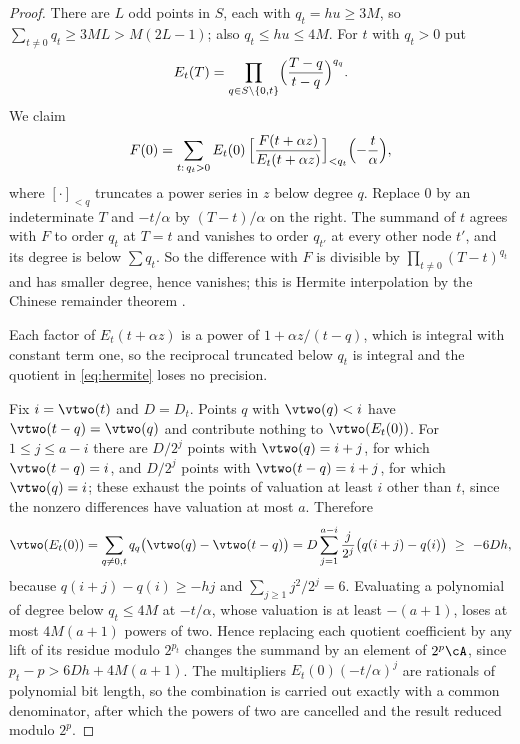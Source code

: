 \begin{proof}
There are $L$ odd points in $S$, each with $q_t=hu\ge3M$, so
$\sum_{t\ne0}q_t\ge3ML>M(2L-1)$; also $q_t\le hu\le4M$. For $t$ with $q_t>0$ put
\[
E_t(T)=\prod_{q\in S\setminus\{0,t\}}\Bigl(\frac{T-q}{t-q}\Bigr)^{q_q}.
\]
We claim
\begin{equation}\label{eq:hermite}
F(0)=\sum_{t:\,q_t>0}E_t(0)\,\Bigl[\frac{F(t+\alpha z)}{E_t(t+\alpha z)}\Bigr]_{<q_t}\Bigl(-\frac t\alpha\Bigr),
\end{equation}
where $[\cdot]_{<q}$ truncates a power series in $z$ below degree $q$. Replace $0$
by an indeterminate $T$ and $-t/\alpha$ by $(T-t)/\alpha$ on the right. The
summand of $t$ agrees with $F$ to order $q_t$ at $T=t$ and vanishes to order
$q_{t'}$ at every other node $t'$, and its degree is below $\sum q_t$. So the
difference with $F$ is divisible by $\prod_{t\ne0}(T-t)^{q_t}$ and has smaller
degree, hence vanishes; this is Hermite interpolation by the Chinese remainder
theorem \cite[Section 5.6]{vzGG13}.

Each factor of $E_t(t+\alpha z)$ is a power of $1+\alpha z/(t-q)$, which is
integral with constant term one, so the reciprocal truncated below $q_t$ is
integral and the quotient in \eqref{eq:hermite} loses no precision.

Fix $i=\vtwo(t)$ and $D=D_t$. Points $q$ with $\vtwo(q)<i$ have
$\vtwo(t-q)=\vtwo(q)$ and contribute nothing to $\vtwo(E_t(0))$. For $1\le j\le
a-i$ there are $D/2^j$ points with $\vtwo(q)=i+j$, for which $\vtwo(t-q)=i$, and
$D/2^j$ points with $\vtwo(t-q)=i+j$, for which $\vtwo(q)=i$; these exhaust the
points of valuation at least $i$ other than $t$, since the nonzero differences
have valuation at most $a$. Therefore
\begin{equation}\label{eq:vEt}
\vtwo(E_t(0))=\sum_{q\ne0,t}q_q\bigl(\vtwo(q)-\vtwo(t-q)\bigr)
=D\sum_{j=1}^{a-i}\frac j{2^j}\bigl(q(i+j)-q(i)\bigr)\ \ge\ -6Dh,
\end{equation}
because $q(i+j)-q(i)\ge-hj$ and $\sum_{j\ge1}j^2/2^j=6$. Evaluating a polynomial of
degree below $q_t\le4M$ at $-t/\alpha$, whose valuation is at least $-(a+1)$,
loses at most $4M(a+1)$ powers of two. Hence replacing each quotient coefficient
by any lift of its residue modulo $2^{p_t}$ changes the summand by an element of
$2^p\cA$, since $p_t-p>6Dh+4M(a+1)$. The multipliers $E_t(0)(-t/\alpha)^j$ are
rationals of polynomial bit length, so the combination is carried out exactly
with a common denominator, after which the powers of two are cancelled and the
result reduced modulo $2^p$.
\end{proof}

